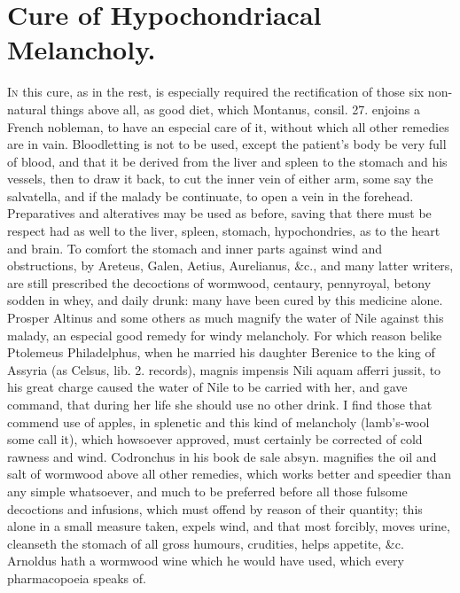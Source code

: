 
\section{Cure of Hypochondriacal Melancholy.}

\lettrine{I}{n} this cure, as in the rest, is especially required the rectification
of those six non-natural things above all, as good diet, which
Montanus, consil. 27. enjoins a French nobleman, to have an especial
care of it, without which all other remedies are in vain. Bloodletting
is not to be used, except the patient's body be very full of blood, and
that it be derived from the liver and spleen to the stomach and his
vessels, then to draw it back, to cut the inner vein of either
arm, some say the salvatella, and if the malady be continuate, to
open a vein in the forehead.
Preparatives and alteratives may be used as before, saving that there
must be respect had as well to the liver, spleen, stomach,
hypochondries, as to the heart and brain. To comfort the stomach
and inner parts against wind and obstructions, by Areteus, Galen,
Aetius, Aurelianus, \&c., and many latter writers, are still prescribed
the decoctions of wormwood, centaury, pennyroyal, betony sodden in
whey, and daily drunk: many have been cured by this medicine alone.
Prosper Altinus and some others as much magnify the water of Nile
against this malady, an especial good remedy for windy melancholy. For
which reason belike Ptolemeus Philadelphus, when he married his
daughter Berenice to the king of Assyria (as Celsus, lib. 2. records),
magnis impensis Nili aquam afferri jussit, to his great charge caused
the water of Nile to be carried with her, and gave command, that during
her life she should use no other drink. I find those that commend use
of apples, in splenetic and this kind of melancholy (lamb's-wool some
call it), which howsoever approved, must certainly be corrected of cold
rawness and wind.
Codronchus in his book de sale absyn. magnifies the oil and salt of
wormwood above all other remedies, which works better and
speedier than any simple whatsoever, and much to be preferred before
all those fulsome decoctions and infusions, which must offend by reason
of their quantity; this alone in a small measure taken, expels wind,
and that most forcibly, moves urine, cleanseth the stomach of all gross
humours, crudities, helps appetite, \&c. Arnoldus hath a wormwood wine
which he would have used, which every pharmacopoeia speaks of.
